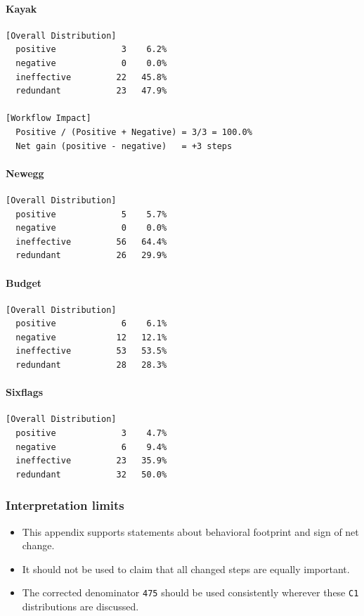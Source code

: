 \paragraph{Kayak}

\begin{verbatim}
[Overall Distribution]
  positive             3    6.2%
  negative             0    0.0%
  ineffective         22   45.8%
  redundant           23   47.9%

[Workflow Impact]
  Positive / (Positive + Negative) = 3/3 = 100.0%
  Net gain (positive - negative)   = +3 steps
\end{verbatim}

\paragraph{Newegg}

\begin{verbatim}
[Overall Distribution]
  positive             5    5.7%
  negative             0    0.0%
  ineffective         56   64.4%
  redundant           26   29.9%
\end{verbatim}

\paragraph{Budget}

\begin{verbatim}
[Overall Distribution]
  positive             6    6.1%
  negative            12   12.1%
  ineffective         53   53.5%
  redundant           28   28.3%
\end{verbatim}

\paragraph{Sixflags}

\begin{verbatim}
[Overall Distribution]
  positive             3    4.7%
  negative             6    9.4%
  ineffective         23   35.9%
  redundant           32   50.0%
\end{verbatim}

\subsubsection{Interpretation limits}

\begin{itemize}
\tightlist
\item
  This appendix supports statements about behavioral footprint and sign
  of net change.
\item
  It should not be used to claim that all changed steps are equally
  important.
\item
  The corrected denominator \texttt{475} should be used consistently
  wherever these \texttt{C1} distributions are discussed.
\end{itemize}


